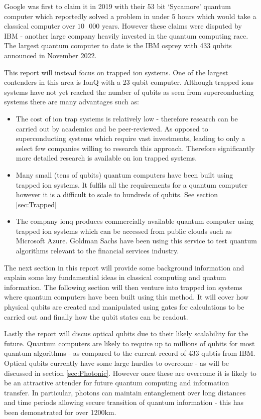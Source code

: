 Google was first to claim it in 2019 with their 53 bit `Sycamore' quantum computer which reportedly solved a problem in under 5 hours which would take a classical computer over $10\text{ }000$ years.\cite{gibney_hello_2019} 
However these claims were disputed by IBM - another large company heavily invested in the quantum computing race.
The largest quantum computer to date is the IBM osprey with 433 qubits announced in November 2022.\cite{irving_ibm_2022}

This report will instead focus on trapped ion systems. 
One of the largest contenders in this area is IonQ with a 23 qubit computer. 
 Although trapped ions systems have not yet reached the number of qubits as seen from superconducting systems there are many advantages such as: 
\begin{itemize}
    \item The cost of ion trap systems is relatively low - therefore research can be carried out by academics and be peer-reviewed. As opposed to superconducting systems which require vast investments, leading to only a select few companies willing to research this approach. Therefore significantly more detailed research is available on ion trapped systems.  
    \item Many small (tens of qubits) quantum computers have been built using trapped ion systems. It fulfils all the requirements for a quantum computer however it is a difficult to scale to hundreds of qubits. See section \ref{sec:Trapped}
    \item The company ionq produces commercially available quantum computer using trapped ion systems which can be accessed from public clouds such as Microsoft Azure. \cite{sonialopezbravo_ionq_nodate} Goldman Sachs have been using this service to test quantum algorithms relevant to the financial services industry. \cite{noauthor_goldman_2021}
\end{itemize}




The next section in this report will provide some background information and explain some key fundamential ideas in classical computing and quatum information. 
The following section will then venture into trapped ion systems where quantum computers have been built using this method.
It will cover how physical qubits are created and manipulated using gates for calculations to be carried out and finally how the qubit states can be readout. 


Lastly the report will discus optical qubits due to their likely scalability for the future. 
Quantum computers are likely to require up to millions of qubits for most quantum algorithms - as compared to the current record of 433 qubtis from IBM. \cite{bergou_quantum_2021} 
Optical qubits currently have some large hurdles to overcome - as will be discussed in section \ref{sec:Photonic}. 
However once these are overcome it is likely to be an attractive attender for future quantum computing and information transfer.
In particular, photons can maintain entanglement over long distances and time periods allowing secure transition of quantum information - this has been demonstrated for over 1200km. \cite{yin_satellite-based_2017}
